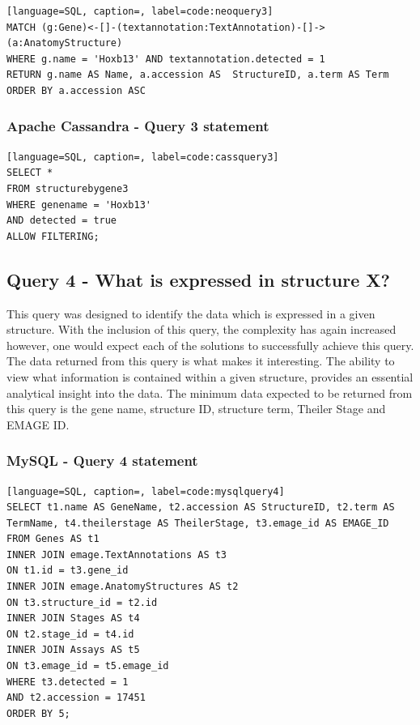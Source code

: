 \begin{lstlisting}[language=SQL, caption=, label=code:neoquery3]
MATCH (g:Gene)<-[]-(textannotation:TextAnnotation)-[]->(a:AnatomyStructure)
WHERE g.name = 'Hoxb13' AND textannotation.detected = 1
RETURN g.name AS Name, a.accession AS  StructureID, a.term AS Term
ORDER BY a.accession ASC
\end{lstlisting}

\subsubsection*{Apache Cassandra - Query 3 statement}\label{cassquery3statement}

\begin{lstlisting}[language=SQL, caption=, label=code:cassquery3]
SELECT *
FROM structurebygene3
WHERE genename = 'Hoxb13'
AND detected = true
ALLOW FILTERING;
\end{lstlisting}

\subsection*{Query 4 - What is expressed in structure X?}\label{query4}
This query was designed to identify the data which is expressed in a given structure. With the inclusion of this query, the complexity has again increased however, one would expect each of the solutions to successfully achieve this query. The data returned from this query is what makes it interesting. The ability to view what information is contained within a given structure, provides an essential analytical insight into the data. The minimum data expected to be returned from this query is the gene name, structure ID, structure term, Theiler Stage and EMAGE ID.

\subsubsection*{MySQL - Query 4 statement}\label{mysqlquery4statement}

\begin{lstlisting}[language=SQL, caption=, label=code:mysqlquery4]
SELECT t1.name AS GeneName, t2.accession AS StructureID, t2.term AS TermName, t4.theilerstage AS TheilerStage, t3.emage_id AS EMAGE_ID
FROM Genes AS t1
INNER JOIN emage.TextAnnotations AS t3
ON t1.id = t3.gene_id
INNER JOIN emage.AnatomyStructures AS t2
ON t3.structure_id = t2.id
INNER JOIN Stages AS t4
ON t2.stage_id = t4.id
INNER JOIN Assays AS t5
ON t3.emage_id = t5.emage_id
WHERE t3.detected = 1
AND t2.accession = 17451
ORDER BY 5;
\end{lstlisting}

